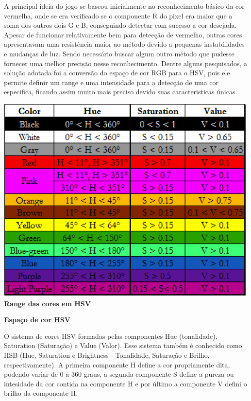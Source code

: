 \documentclass[a4paper]{article}
\begin{document}
A principal ideia do jogo se baseou inicialmente no reconhecimento básico da cor vermelha, onde se era verificado se o componente R do pixel era maior que a soma dos outros dois G e B, conseguindo detectar com sucesso a cor desejada. Apesar de funcionar relativamente bem para detecção de vermelho, outras cores apresentavam uma resistência maior ao método devido a pequenas instabilidades e mudanças de luz. Sendo necessário buscar algum outro método que pudesse fornecer uma melhor precisão nesse reconhecimento. Dentre alguns pesquisados, a solução adotada foi a conversão do espaço de cor RGB para o HSV, pois ele permite definir um range e uma intensidade para a detecção de uma cor especifica, ficando assim muito mais preciso devido suas caracteristicas únicas.


\vspace{5.00mm}

\begin{center}
\includegraphics[scale=0.8]{scale.png} \\
\textbf{\normalsize Range das cores em HSV}
\end{center}


\begin{flushleft}
\textbf{\large Espaço de cor HSV}
\end{flushleft}


O sistema de cores HSV formadas pelas componentes Hue (tonalidade), Saturation (Saturação) e Value (Valor). Esse sistema também é conhecido como HSB (Hue, Saturation e Brightness - Tonalidade, Saturação e Brilho, respectivamente). A primeira componente H define a cor propriamente dita, podendo variar de 0 a 360 graus, a segunda componente S define a pureza ou intesidade da cor contida na componente H e por último a componente V defini o brilho da componente H.
\end{document}
